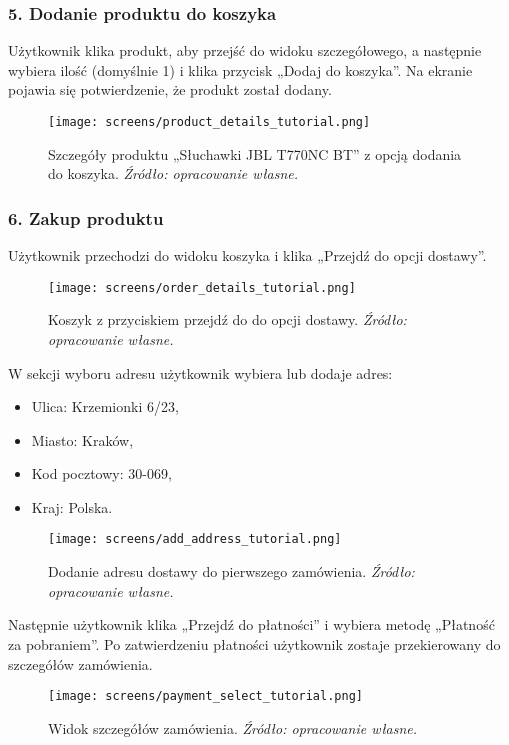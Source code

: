 \documentclass[12pt,a4paper,oneside]{article}
\theoremstyle{definition}
\numberwithin{equation}{section}
\begin{document}
\subsubsection*{\textbf{5. Dodanie produktu do koszyka}}
Użytkownik klika produkt, aby przejść do widoku szczegółowego, a następnie wybiera ilość (domyślnie 1) i klika przycisk „Dodaj do koszyka”. Na ekranie pojawia się potwierdzenie, że produkt został dodany.

\begin{figure}[H]
    \centering
    \texttt{[image: screens/product\_details\_tutorial.png]}
    \caption{Szczegóły produktu „Słuchawki JBL T770NC BT” z opcją dodania do koszyka. \emph{Źródło: opracowanie własne.}}
    \label{fig:product_details_tutorial}
\end{figure}

\subsubsection*{\textbf{6. Zakup produktu}}
Użytkownik przechodzi do widoku koszyka i klika „Przejdź do opcji dostawy”. 
\begin{figure}[H]
    \centering
    \texttt{[image: screens/order\_details\_tutorial.png]}
    \caption{Koszyk z przyciskiem przejdź do do opcji dostawy. \emph{Źródło: opracowanie własne.}}
    \label{fig:order_details_first_tutorial}
\end{figure}
W sekcji wyboru adresu użytkownik wybiera lub dodaje adres:
\begin{itemize}
    \item Ulica: Krzemionki 6/23,
    \item Miasto: Kraków,
    \item Kod pocztowy: 30-069,
    \item Kraj: Polska.
\end{itemize}
\begin{figure}[H]
    \centering
    \texttt{[image: screens/add\_address\_tutorial.png]}
    \caption{Dodanie adresu dostawy do pierwszego zamówienia. \emph{Źródło: opracowanie własne.}}
    \label{fig:add_address_tutorial}
\end{figure}


Następnie użytkownik klika „Przejdź do płatności” i wybiera metodę „Płatność za pobraniem”. Po zatwierdzeniu płatności użytkownik zostaje przekierowany do szczegółów zamówienia.

\begin{figure}[H]
    \centering
    \texttt{[image: screens/payment\_select\_tutorial.png]}
    \caption{Widok szczegółów zamówienia. \emph{Źródło: opracowanie własne.}}
    \label{fig:order_details_tutorial}
\end{figure}
\end{document}
